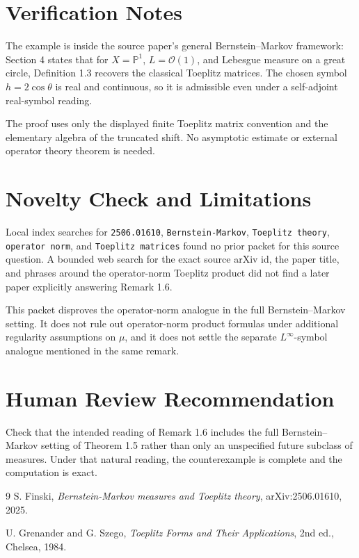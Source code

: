\documentclass[11pt]{article}
\begin{document}
\section*{Verification Notes}

The example is inside the source paper's general Bernstein--Markov framework:
Section 4 states that for \(X=\mathbb P^1\), \(L=\mathcal O(1)\), and Lebesgue
measure on a great circle, Definition 1.3 recovers the classical Toeplitz
matrices. The chosen symbol \(h=2\cos\theta\) is real and continuous, so it is
admissible even under a self-adjoint real-symbol reading.

The proof uses only the displayed finite Toeplitz matrix convention and the
elementary algebra of the truncated shift. No asymptotic estimate or external
operator theory theorem is needed.

\section*{Novelty Check and Limitations}

Local index searches for \texttt{2506.01610}, \texttt{Bernstein-Markov},
\texttt{Toeplitz theory}, \texttt{operator norm}, and \texttt{Toeplitz matrices}
found no prior packet for this source question. A bounded web search for the
exact source arXiv id, the paper title, and phrases around the operator-norm
Toeplitz product did not find a later paper explicitly answering Remark 1.6.

This packet disproves the operator-norm analogue in the full
Bernstein--Markov setting. It does not rule out operator-norm product formulas
under additional regularity assumptions on \(\mu\), and it does not settle the
separate \(L^\infty\)-symbol analogue mentioned in the same remark.

\section*{Human Review Recommendation}

Check that the intended reading of Remark 1.6 includes the full
Bernstein--Markov setting of Theorem 1.5 rather than only an unspecified
future subclass of measures. Under that natural reading, the counterexample is
complete and the computation is exact.

\begin{thebibliography}{9}
S. Finski,
\emph{Bernstein-Markov measures and Toeplitz theory},
arXiv:2506.01610, 2025.

U. Grenander and G. Szego,
\emph{Toeplitz Forms and Their Applications},
2nd ed., Chelsea, 1984.
\end{thebibliography}
\end{document}
